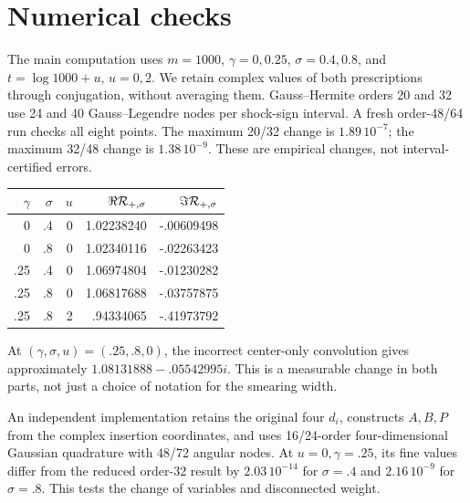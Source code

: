 \documentclass[11pt,a4paper]{article}
\begin{document}
\section{Numerical checks}
The main computation uses $m=1000$, $\gamma=0,0.25$,
$\sigma=0.4,0.8$, and $t=\log1000+u$, $u=0,2$.
We retain complex values of both prescriptions through conjugation,
without averaging them. Gauss--Hermite orders 20 and 32 use
24 and 40 Gauss--Legendre nodes per shock-sign interval.
A fresh order-48/64 run checks all eight points.
The maximum 20/32 change is $1.89\,10^{-7}$; the maximum
32/48 change is $1.38\,10^{-9}$. These are empirical changes,
not interval-certified errors.
\begin{center}
\begin{tabular}{rrrrr}
\toprule
$\gamma$ & $\sigma$ & $u$ & $\Re{\cal R}_{+,\sigma}$ &
 $\Im{\cal R}_{+,\sigma}$\\
\midrule
0 & .4 & 0 & 1.02238240 & -.00609498\\
0 & .8 & 0 & 1.02340116 & -.02263423\\
.25 & .4 & 0 & 1.06974804 & -.01230282\\
.25 & .8 & 0 & 1.06817688 & -.03757875\\
.25 & .8 & 2 & .94334065 & -.41973792\\
\bottomrule
\end{tabular}
\end{center}
At $(\gamma,\sigma,u)=(.25,.8,0)$, the incorrect center-only
convolution gives approximately $1.08131888-.05542995i$.
This is a measurable change in both parts, not just a choice of
notation for the smearing width.

An independent implementation retains the original four $d_i$,
constructs $A,B,P$ from the complex insertion coordinates, and uses
16/24-order four-dimensional Gaussian quadrature with 48/72 angular
nodes. At $u=0,\gamma=.25$, its fine values differ from the reduced
order-32 result by $2.03\,10^{-14}$ for $\sigma=.4$ and
$2.16\,10^{-9}$ for $\sigma=.8$.
This tests the change of variables and disconnected weight.
\end{document}
